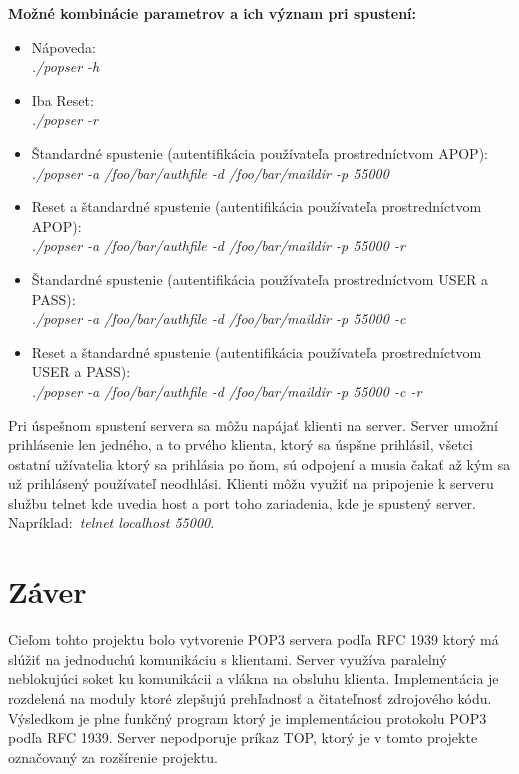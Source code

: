 \documentclass[11pt,a4paper]{article}
\begin{document}
	\textbf{Možné kombinácie parametrov a ich význam pri spustení:}
	\begin{itemize}

		\item Nápoveda:\\[0.1em]
		\textit{./popser -h}

		\item Iba Reset:\\[0.1em]
		\textit{./popser -r}

		\item Štandardné spustenie (autentifikácia používateľa prostredníctvom APOP):\\[0.1em]
		\textit{./popser -a /foo/bar/authfile -d /foo/bar/maildir -p 55000}

		\item Reset a štandardné spustenie (autentifikácia používateľa prostredníctvom APOP):\\[0.1em]
		\textit{./popser -a /foo/bar/authfile -d /foo/bar/maildir -p 55000 -r}

		\item Štandardné spustenie (autentifikácia používateľa prostredníctvom USER a PASS):\\[0.1em]
		\textit{./popser -a /foo/bar/authfile -d /foo/bar/maildir -p 55000 -c}

		\item Reset a štandardné spustenie (autentifikácia používateľa prostredníctvom USER a PASS):\\[0.1em]
		\textit{./popser -a /foo/bar/authfile -d /foo/bar/maildir -p 55000 -c -r }

	\end{itemize}

	\indent Pri úspešnom spustení servera sa môžu napájať klienti na server. Server umožní prihlásenie len jedného, a to prvého klienta, ktorý sa úspšne prihlásil, všetci ostatní užívatelia ktorý sa prihlásia po ňom, sú odpojení a musia čakať až kým sa už prihlásený používateľ neodhlási. Klienti môžu využiť na pripojenie k serveru službu telnet kde uvedia host a port toho zariadenia, kde je spustený server. Napríklad: \textit{telnet localhost 55000}.

\section{Záver}

\indent Cieľom tohto projektu bolo vytvorenie POP3 servera podľa RFC 1939\cite{POP3} ktorý má slúžiť na jednoduchú komunikáciu s klientami. Server využíva paralelný neblokujúci soket ku komunikácii a vlákna na obsluhu klienta. Implementácia je rozdelená na moduly ktoré zlepšujú prehľadnosť a čitateľnosť zdrojového kódu.\\[0.4em]
\indent Výsledkom je plne funkčný program ktorý je implementáciou protokolu POP3 podľa RFC 1939\cite{POP3}. Server nepodporuje príkaz TOP, ktorý je v tomto projekte označovaný za rozšírenie projektu.
\end{document}
